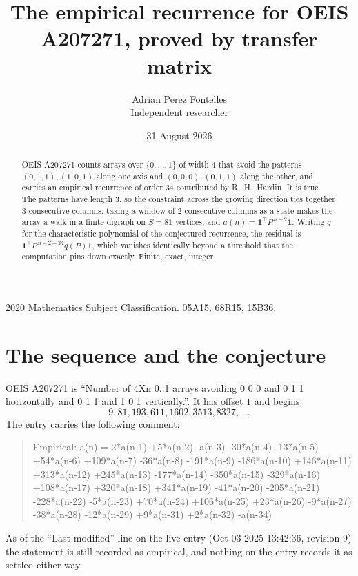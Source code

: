 \documentclass[11pt,a4paper]{article}
\title{The empirical recurrence for OEIS A207271, proved by transfer matrix}
\author{Adrian Perez Fontelles\\ \small Independent researcher}
\date{31 August 2026}
\theoremstyle{plain}
\theoremstyle{definition}
\begin{document}
\maketitle

\begin{abstract}
OEIS A207271 counts arrays over $\{0,\dots,1\}$ of width $4$ that avoid the patterns
$(0,1,1), (1,0,1)$ along one axis and $(0,0,0), (0,1,1)$ along the other, and carries an empirical recurrence of
order $34$ contributed by R.~H.~Hardin. It is true. The patterns have length $3$, so
the constraint across the growing direction ties together $3$ consecutive columns: taking a
window of $2$ consecutive columns as a state makes the array a walk in a finite digraph
on $S=81$ vertices, and $a(n)=\mathbf{1}^{\!\top}P^{\,n-2}\mathbf{1}$. Writing $q$
for the characteristic polynomial of the conjectured recurrence, the residual is
$\mathbf{1}^{\!\top}P^{\,n-2-34}q(P)\mathbf{1}$, which vanishes identically
beyond a threshold that the computation pins down exactly. Finite, exact, integer.
\end{abstract}

\noindent\small 2020 Mathematics Subject Classification. 05A15, 68R15, 15B36.\normalsize

\section{The sequence and the conjecture}

OEIS A207271 is ``Number of 4Xn 0..1 arrays avoiding 0 0 0 and 0 1 1 horizontally and 0 1 1 and 1 0 1 vertically.''. It has offset
$1$ and begins
\[
9, 81, 193, 611, 1602, 3513, 8327,\ \dots
\]
The entry carries the following comment:
\begin{quote}\small
Empirical: a(n) = 2*a(n-1) +5*a(n-2) -a(n-3) -30*a(n-4) -13*a(n-5) +54*a(n-6) +109*a(n-7) -36*a(n-8) -191*a(n-9) -186*a(n-10) +146*a(n-11) +313*a(n-12) +245*a(n-13) -177*a(n-14) -350*a(n-15) -329*a(n-16) +108*a(n-17) +320*a(n-18) +341*a(n-19) -41*a(n-20) -205*a(n-21) -228*a(n-22) -5*a(n-23) +70*a(n-24) +106*a(n-25) +23*a(n-26) -9*a(n-27) -38*a(n-28) -12*a(n-29) +9*a(n-31) +2*a(n-32) -a(n-34)
\end{quote}
As of the ``Last modified'' line on the live entry (Oct 03 2025 13:42:36, revision
9) the statement is still recorded as empirical, and nothing on the entry
records it as settled either way.
\end{document}
